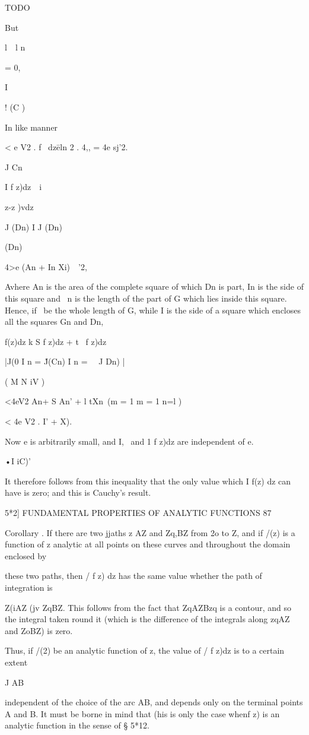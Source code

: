 TODO

But

l\ \ l n

= 0,

I

! (C )

In like manner

< e V2 . f \ dz\= eln \/2 . 4,, = 4e sj'2.

J Cn

I f z)dz\ \ i \ \ {z-z )vdz\

J (Dn) I J (Dn)

(Dn)

  4>e (An + In Xi)\ \ '2,

Avhere An is the area of the complete square of which Dn is part, In
is the side of this square and \ n is the length of the part of G
which lies inside this square. Hence, if \ be the whole length of G,
while I is the side of a square which encloses all the squares Gn and
Dn,

f(z)dz k S f z)dz + t \ f z)dz

|J(0 I n = \'J(Cn) I n = \ \ J Dn) |

( M N iV )

<4eV2 An+ S An' + l tXn\ (m = 1 m = 1 n=l )

< 4e V2 . I' + X).

Now e is arbitrarily small, and I, \ and 1 f z)dz are independent of
e.

•I iC)'

It therefore follows from this inequality that the only value which I
f(z) dz can have is zero; and this is Cauchy's result.

5*2] FUNDAMENTAL PROPERTIES OF ANALYTIC FUNCTIONS 87

Corollary . If there are two jjaths z AZ and Zq,BZ from 2o to Z, and
if /(z) is a function of z analytic at all points on these curves and
throughout the domain enclosed by

these two paths, then / f z) dz has the same value whether the path of
integration is

Z(iAZ (jv ZqBZ. This follows from the fact that ZqAZBzq is a contour,
and so the integral taken round it (which is the difference of the
integrals along zqAZ and ZoBZ) is zero.

Thus, if /(2) be an analytic function of z, the value of / f z)dz is
to a certain extent

J AB

independent of the choice of the arc AB, and depends only on the
terminal points A and B. It must be borne in mind that (his is only
the case whenf z) is an analytic function in the sense of § 5*12.

}
